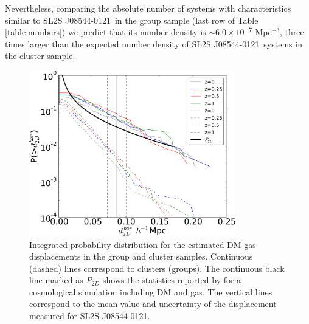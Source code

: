 \documentclass{emulateapj}
\newcommand{\bullg}{SL2S J08544-0121}
\begin{document}
Nevertheless, comparing the absolute number of systems with
characteristics similar to \bullg\ in the group sample
(last row of Table \ref{table:numbers}) we predict that its number
density is $\sim 6.0\times 10^{-7}$ Mpc$^{-3}$, three times larger
than the expected number density of \bullg\ systems in the cluster
sample. 


\begin{figure}
\begin{center}
\includegraphics[width=0.8\textwidth]{figure_3.pdf}
\end{center}
\caption{Integrated probability distribution for the estimated
  DM-gas displacements in the group and cluster samples. Continuous (dashed)
  lines correspond to clusters (groups). The continuous black line
  marked as $P_{2D}$ shows the statistics reported by
  \citet{ForeroRomero2010} for a cosmological simulation including DM
  and gas. The vertical lines correspond to the mean value and
  uncertainty of the displacement measured for \bullg.} 
\label{fig:baryonic_displacements}
\end{figure}
\end{document}
